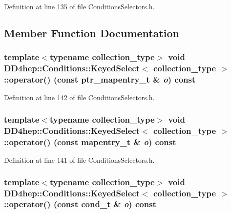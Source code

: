 Definition at line 135 of file ConditionsSelectors.h.

\subsection{Member Function Documentation}
\hypertarget{class_d_d4hep_1_1_conditions_1_1_keyed_select_a4a376af196341fff56f4e44331bf79fe}{
\subsubsection[{operator()}]{\setlength{\rightskip}{0pt plus 5cm}template$<$typename collection\_\-type$>$ void {\bf DD4hep::Conditions::KeyedSelect}$<$ collection\_\-type $>$::operator() (const {\bf ptr\_\-mapentry\_\-t} \& {\em o}) const}}
\label{class_d_d4hep_1_1_conditions_1_1_keyed_select_a4a376af196341fff56f4e44331bf79fe}


Definition at line 142 of file ConditionsSelectors.h.\hypertarget{class_d_d4hep_1_1_conditions_1_1_keyed_select_a31e838b214cd6eaa8f702f78bff0c075}{
\subsubsection[{operator()}]{\setlength{\rightskip}{0pt plus 5cm}template$<$typename collection\_\-type$>$ void {\bf DD4hep::Conditions::KeyedSelect}$<$ collection\_\-type $>$::operator() (const {\bf mapentry\_\-t} \& {\em o}) const}}
\label{class_d_d4hep_1_1_conditions_1_1_keyed_select_a31e838b214cd6eaa8f702f78bff0c075}


Definition at line 141 of file ConditionsSelectors.h.\hypertarget{class_d_d4hep_1_1_conditions_1_1_keyed_select_a13047ce6f0f51f5f7487180c1dff2dcc}{
\subsubsection[{operator()}]{\setlength{\rightskip}{0pt plus 5cm}template$<$typename collection\_\-type$>$ void {\bf DD4hep::Conditions::KeyedSelect}$<$ collection\_\-type $>$::operator() (const {\bf cond\_\-t} \& {\em o}) const}}
\label{class_d_d4hep_1_1_conditions_1_1_keyed_select_a13047ce6f0f51f5f7487180c1dff2dcc}



